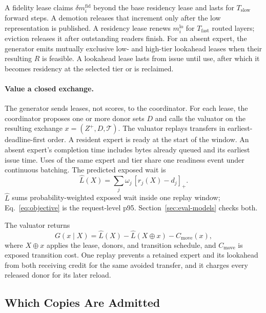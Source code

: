 A fidelity lease claims \(\delta m_i^{\mathrm{fid}}\) beyond the base residency lease and lasts for \(T_{\mathrm{slow}}\) forward steps.
A demotion releases that increment only after the low representation is published.
A residency lease renews \(m_i^{\mathrm{lo}}\) for \(T_{\mathrm{fast}}\) routed layers; eviction releases it after outstanding readers finish.
For an absent expert, the generator emits mutually exclusive low- and high-tier lookahead leases when their resulting \(\widehat R\) is feasible.
A lookahead lease lasts from issue until use, after which it becomes residency at the selected tier or is reclaimed.

\paragraph{Value a closed exchange.}
The generator sends leases, not scores, to the coordinator.
For each lease, the coordinator proposes one or more donor sets \(D\) and calls the valuator on the resulting exchange \(x=(Z^+,D,\mathcal T)\).
The valuator replays transfers in earliest-deadline-first order.
A resident expert is ready at the start of the window.
An absent expert's completion time includes bytes already queued and its earliest issue time.
Uses of the same expert and tier share one readiness event under continuous batching.
The predicted exposed wait is
\begin{equation}
  \widehat L(X)
  =\sum_j \omega_j\,[r_j(X)-d_j]_+.
  \label{eq:predicted-wait}
\end{equation}
\(\widehat L\) sums probability-weighted exposed wait inside one replay window; Eq.~\eqref{eq:objective} is the request-level p95.
Section~\ref{sec:eval-models} checks both.

The valuator returns
\begin{equation}
  G(x\mid X)
  =\widehat L(X)-\widehat L(X\oplus x)-C_{\mathrm{move}}(x),
  \label{eq:value}
\end{equation}
where \(X\oplus x\) applies the lease, donors, and transition schedule, and \(C_{\mathrm{move}}\) is exposed transition cost.
One replay prevents a retained expert and its lookahead from both receiving credit for the same avoided transfer, and it charges every released donor for its later reload.

\subsection{Which Copies Are Admitted}
\label{sec:coordinator}
\label{sec:alg}

